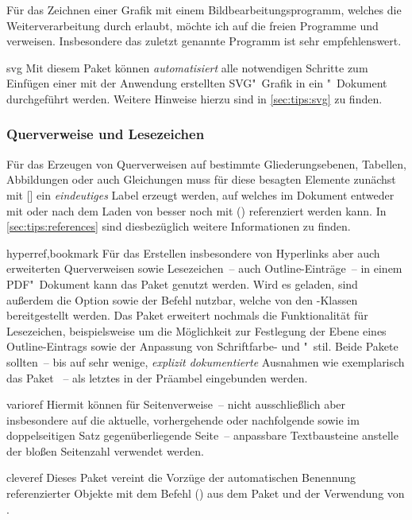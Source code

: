 Für das Zeichnen einer Grafik mit einem Bildbearbeitungsprogramm, welches die 
Weiterverarbeitung durch  erlaubt, möchte ich auf die freien 
Programme  und  verweisen. 
Insbesondere das zuletzt genannte Programm ist sehr empfehlenswert. 
%
\begin{packages}
\item[svg]
  Mit diesem Paket können \emph{automatisiert} alle notwendigen Schritte zum 
  Einfügen einer mit der Anwendung  erstellten 
  SVG"~Grafik in ein "~Dokument durchgeführt werden. Weitere 
  Hinweise hierzu sind in \autoref{sec:tips:svg} zu finden.
\end{packages}
%



\subsubsection{%
  Querverweise und Lesezeichen%
}
%
Für das Erzeugen von Querverweisen auf bestimmte Gliederungsebenen, Tabellen, 
Abbildungen oder auch Gleichungen muss für diese besagten Elemente zunächst mit 
[] ein \emph{eindeutiges} Label erzeugt werden, auf 
welches im Dokument entweder mit  oder nach dem Laden von 
 besser noch mit () 
referenziert werden kann. In \autoref{sec:tips:references} sind diesbezüglich 
weitere Informationen zu finden.
%
\begin{packages}
\item[hyperref,bookmark]
  Für das Erstellen insbesondere von Hyperlinks aber auch erweiterten 
  Querverweisen sowie Lesezeichen~-- auch Outline-Einträge~-- in einem 
  PDF"~Dokument kann das Paket  genutzt werden. Wird 
  es geladen, sind außerdem die Option  sowie der Befehl 
   nutzbar, welche von den \TUDScript-Klassen bereitgestellt 
  werden. Das Paket  erweitert nochmals die Funktionalität 
  für Lesezeichen, beispielsweise um die Möglichkeit zur Festlegung der Ebene 
  eines Outline-Eintrags sowie der Anpassung von Schriftfarbe- und "~stil.
  Beide Pakete sollten~-- bis auf sehr wenige, \emph{explizit dokumentierte} 
  Ausnahmen wie exemplarisch das Paket ~-- als letztes in 
  der Präambel eingebunden werden.
\item[varioref]
  Hiermit können für Seitenverweise~-- nicht ausschließlich aber insbesondere 
  auf die aktuelle, vorhergehende oder nachfolgende sowie im doppelseitigen 
  Satz gegenüberliegende Seite~-- anpassbare Textbausteine anstelle der bloßen 
  Seitenzahl verwendet werden.
\item[cleveref]
  Dieses Paket vereint die Vorzüge der automatischen Benennung referenzierter 
  Objekte mit dem Befehl () aus dem Paket 
   und der Verwendung von .
\end{packages}
%
%




